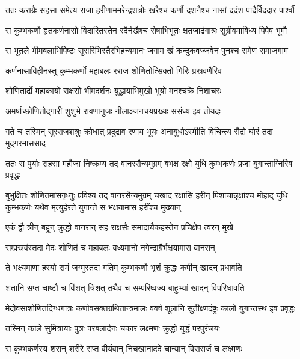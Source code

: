 \twolineshloka
{ततः कराग्रैः सहसा समेत्य राजा हरीणाममरेन्द्रशत्रोः}
{खरैश्च कर्णौ दशनैश्च नासां ददंश पादैर्विददार पार्श्वौ} %

\twolineshloka
{स कुम्भकर्णो हृतकर्णनासो विदारितस्तेन रदैर्नखैश्च}
{रोषाभिभूतः क्षतजार्द्रगात्रः सुग्रीवमाविध्य पिपेष भूमौ} %

\twolineshloka
{स भूतले भीमबलाभिपिष्टः सुरारिभिस्तैरभिहन्यमानः}
{जगाम खं कन्दुकवज्जवेन पुनश्च रामेण समाजगाम} %

\twolineshloka
{कर्णनासाविहीनस्तु कुम्भकर्णो महाबलः}
{रराज शोणितोत्सिक्तो गिरिः प्रस्रवणैरिव} %

\twolineshloka
{शोणितार्द्रो महाकायो राक्षसो भीमदर्शनः}
{युद्धायाभिमुखो भूयो मनश्चक्रे निशाचरः} %

\twolineshloka
{अमर्षाच्छोणितोद्गारी शुशुभे रावणानुजः}
{नीलाञ्जनचयप्रख्यः ससंध्य इव तोयदः} %

\twolineshloka
{गते च तस्मिन् सुरराजशत्रुः क्रोधात् प्रदुद्राव रणाय भूयः}
{अनायुधोऽस्मीति विचिन्त्य रौद्रो घोरं तदा मुद्गरमाससाद} %

\twolineshloka
{ततः स पुर्याः सहसा महौजा निष्क्रम्य तद् वानरसैन्यमुग्रम्}
{बभक्ष रक्षो युधि कुम्भकर्णः प्रजा युगान्ताग्निरिव प्रवृद्धः} %

\threelineshloka
{बुभुक्षितः शोणितमांसगृध्नुः प्रविश्य तद् वानरसैन्यमुग्रम्}
{चखाद रक्षांसि हरीन् पिशाचान्नृक्षांश्च मोहाद् युधि कुम्भकर्णः}
{यथैव मृत्युर्हरते युगान्ते स भक्षयामास हरींश्च मुख्यान्} %

\twolineshloka
{एकं द्वौ त्रीन् बहून् क्रुद्धो वानरान् सह राक्षसैः}
{समादायैकहस्तेन प्रचिक्षेप त्वरन् मुखे} %

\twolineshloka
{सम्प्रस्रवंस्तदा मेदः शोणितं च महाबलः}
{वध्यमानो नगेन्द्राग्रैर्भक्षयामास वानरान्} %

\twolineshloka
{ते भक्ष्यमाणा हरयो रामं जग्मुस्तदा गतिम्}
{कुम्भकर्णो भृशं क्रुद्धः कपीन् खादन् प्रधावति} %

\twolineshloka
{शतानि सप्त चाष्टौ च विंशत् त्रिंशत् तथैव च}
{सम्परिष्वज्य बाहुभ्यां खादन् विपरिधावति} %

\twolineshloka
{मेदोवसाशोणितदिग्धगात्रः कर्णावसक्तग्रथितान्त्रमालः}
{ववर्ष शूलानि सुतीक्ष्णदंष्ट्रः कालो युगान्तस्थ इव प्रवृद्धः} %

\twolineshloka
{तस्मिन् काले सुमित्रायाः पुत्रः परबलार्दनः}
{चकार लक्ष्मणः क्रुद्धो युद्धं परपुरंजयः} %

\twolineshloka
{स कुम्भकर्णस्य शरान् शरीरे सप्त वीर्यवान्}
{निचखानाददे चान्यान् विससर्ज च लक्ष्मणः} %

